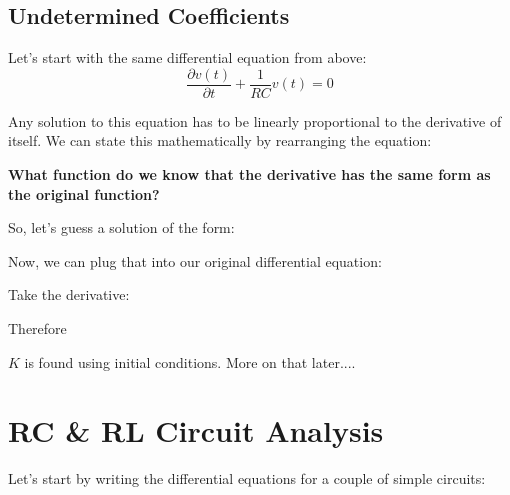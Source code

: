 \documentclass{handout}
\begin{document}
\subsection{Undetermined Coefficients}
Let's start with the same differential equation from above:
\begin{equation}
\frac{\partial v(t)}{\partial t}+\frac{1}{RC}v(t)=0
\end{equation}

Any solution to this equation has to be linearly proportional to the derivative of itself.  We can state this mathematically by rearranging the equation:

\textbf{What function do we know that the derivative has the same form as the original function?}  

So, let's guess a solution of the form:

Now, we can plug that into our original differential equation:

Take the derivative:

Therefore

$K$ is found using initial conditions.  More on that later....

\newpage
\clearpage
\pagebreak

\section{RC \& RL Circuit Analysis}


Let's start by writing the differential equations for a couple of simple circuits:
\end{document}
